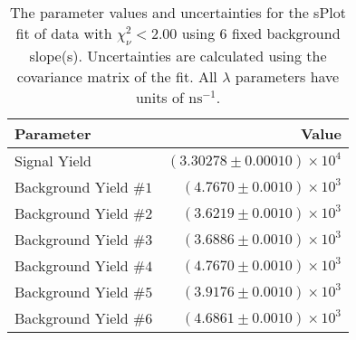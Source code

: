 
\begin{table}
    \begin{center}
        \begin{tabular}{lr}\toprule
            Parameter & Value \\\midrule
            Signal Yield & $(3.30278 \pm 0.00010) \times 10^{4}$ \\
            Background Yield $\#1$ & $(4.7670 \pm 0.0010) \times 10^{3}$ \\
            Background Yield $\#2$ & $(3.6219 \pm 0.0010) \times 10^{3}$ \\
            Background Yield $\#3$ & $(3.6886 \pm 0.0010) \times 10^{3}$ \\
            Background Yield $\#4$ & $(4.7670 \pm 0.0010) \times 10^{3}$ \\
            Background Yield $\#5$ & $(3.9176 \pm 0.0010) \times 10^{3}$ \\
            Background Yield $\#6$ & $(4.6861 \pm 0.0010) \times 10^{3}$ \\\bottomrule
        \end{tabular}
        \caption{The parameter values and uncertainties for the sPlot fit of data with $\chi^2_\nu < 2.00$ using 6 fixed background slope(s). Uncertainties are calculated using the covariance matrix of the fit. All $\lambda$ parameters have units of $\si{\nano\second}^{-1}$.}
    \end{center}
\end{table}
